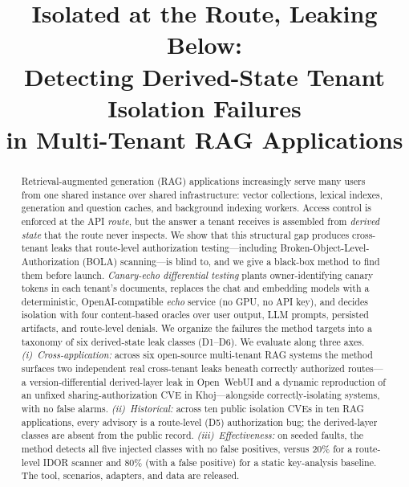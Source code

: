 \IfFileExists{IEEEtran.cls}{\documentclass[conference]{IEEEtran}}{\documentclass[10pt,twocolumn]{article}}
\begin{document}
\title{Isolated at the Route, Leaking Below:\\
Detecting Derived-State Tenant Isolation Failures\\ in Multi-Tenant RAG Applications}

\author{
}

\maketitle

\begin{abstract}
Retrieval-augmented generation (RAG) applications increasingly serve many users from one
shared instance over shared infrastructure: vector collections, lexical indexes, generation and
question caches, and background indexing workers. Access control is enforced at the API
\emph{route}, but the answer a tenant receives is assembled from \emph{derived state} that the
route never inspects. We show that this structural gap produces cross-tenant leaks that
route-level authorization testing---including Broken-Object-Level-Authorization (BOLA) scanning---is
blind to, and we give a black-box method to find them before launch. \emph{Canary-echo
differential testing} plants owner-identifying canary tokens in each tenant's documents, replaces
the chat and embedding models with a deterministic, OpenAI-compatible \emph{echo} service (no GPU,
no API key), and decides isolation with four content-based oracles over user output, LLM prompts,
persisted artifacts, and route-level denials. We organize the failures the method targets into a
taxonomy of six derived-state leak classes (D1--D6). We evaluate along three axes.
\emph{(i)~Cross-application:} across six open-source multi-tenant RAG systems the method surfaces
two independent real cross-tenant leaks beneath correctly authorized routes---a
version-differential derived-layer leak in Open~WebUI and a dynamic reproduction of an unfixed
sharing-authorization CVE in Khoj---alongside correctly-isolating systems, with no false alarms.
\emph{(ii)~Historical:} across ten public isolation CVEs in ten RAG applications, every advisory is
a route-level (D5) authorization bug; the derived-layer classes are absent from the public record.
\emph{(iii)~Effectiveness:} on seeded faults, the method detects all five injected classes with no
false positives, versus $20\%$ for a route-level IDOR scanner and $80\%$ (with a false positive) for
a static key-analysis baseline. The tool, scenarios, adapters, and data are released.
\end{abstract}
\end{document}
